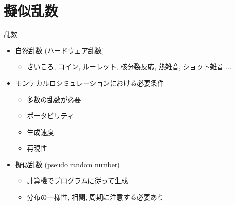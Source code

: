 \section{擬似乱数}

\begin{frame}[t,fragile]{乱数}
  \begin{itemize}
    \setlength{\itemsep}{1em}
  \item 自然乱数 (ハードウェア乱数)
    \begin{itemize}
    \item さいころ, コイン, ルーレット, 核分裂反応, 熱雑音, ショット雑音 ...
    \end{itemize}
  \item モンテカルロシミュレーションにおける必要条件
    \begin{itemize}
    \item 多数の乱数が必要
    \item ポータビリティ
    \item 生成速度
    \item 再現性
    \end{itemize}
  \item 擬似乱数 (pseudo random number)
    \begin{itemize}
    \item 計算機でプログラムに従って生成
    \item 分布の一様性, 相関, 周期に注意する必要あり
    \end{itemize}
  \end{itemize}
\end{frame}

